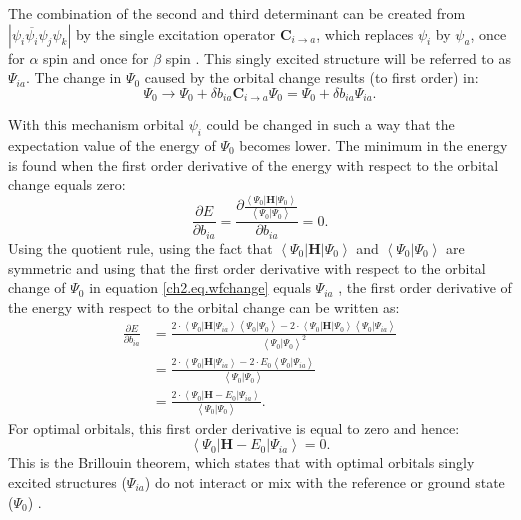 The combination of the second and third determinant can be created from $|\psi_i\overline{\psi_i}\psi_j\psi_k |$ by the single excitation operator $\mathbf{C}_{i \rightarrow a}$, which replaces $\psi_i$ by $\psi_a$, once for $\alpha$ spin and once for $\beta$ spin \cite{ruttink}. This singly excited structure will be referred to as $\Psi_{ia}$. The change in $\Psi_0$ caused by the orbital change results (to first order) in:
\begin{equation}
\Psi_{0} \rightarrow \Psi_{0} + \delta b_{ia} \mathbf{C}_{i \rightarrow a} \Psi_{0} = \Psi_{0} + \delta b_{ia} \Psi_{ia}.
\label{ch2.eq.wfchange}
\end{equation}

With this mechanism orbital $\psi_i$ could be changed in such a way that the expectation value of the energy of $\Psi_0$ becomes lower. The minimum in the energy is found when the first order derivative of the energy with respect to the orbital change equals zero:
\begin{equation}
\frac{\partial E}{\partial b_{ia}}=\frac{\partial \frac{\left < \Psi_0 | \mathbf{H} | \Psi_0 \right >}{\left < \Psi_0 | \Psi_0 \right >}}{\partial b_{ia}}=0.
\label{ch2.eq.foderiv}
\end{equation}
Using the quotient rule, using the fact that $\left < \Psi_0 | \mathbf{H} | \Psi_0 \right >$ and $\left < \Psi_0 | \Psi_0 \right >$ are symmetric and using that the first order derivative with respect to the orbital change of $\Psi_0$ in equation \ref{ch2.eq.wfchange} equals $\Psi_{ia}$ \cite{vbscf2}, the first order derivative of the energy with respect to the orbital change can be written as: 
\begin{equation}
\begin{split}
\frac{\partial E}{\partial b_{ia}} & = \frac{2 \cdot \left < \Psi_0 | \mathbf{H} | \Psi_{ia} \right > \left< \Psi_0 | \Psi_0 \right > - 2 \cdot \left < \Psi_0 | \mathbf{H} | \Psi_0  \right > \left< \Psi_0 | \Psi_{ia}\right>}{\left < \Psi_0 | \Psi_0 \right > ^2 }\\
& = \frac{ 2 \cdot \left < \Psi_0 | \mathbf{H} | \Psi_{ia} \right > - 2 \cdot E_0 \left< \Psi_0 | \Psi_{ia} \right >}{\left < \Psi_0 | \Psi_0 \right >}\\
& = \frac{ 2 \cdot \left < \Psi_0 | \mathbf{H} - E_0 | \Psi_{ia} \right >}{\left < \Psi_0 | \Psi_0 \right >}.
\end{split}
\label{ch2.eq.foderiv2}
\end{equation}
For optimal orbitals, this first order derivative is equal to zero and hence:
\begin{equation}
\left < \Psi_0 | \mathbf{H} - E_0 | \Psi_{ia} \right > = 0.
\label{ch2.eq.brillouin}
\end{equation}
This is the Brillouin theorem, which states that with optimal orbitals singly excited structures ($\Psi_{ia}$) do not interact or mix with the reference or ground state ($\Psi_0$) \cite{brillouin,genbrill}. 

